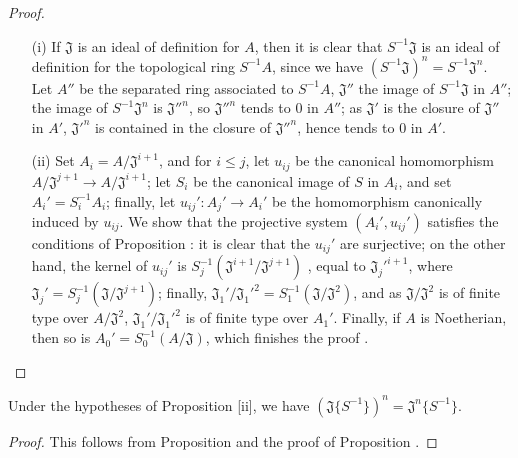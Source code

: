 \begin{proof}
\medskip\noindent
\begin{enumerate}
  \item[(i)] If $\mathfrak{J}$ is an ideal of definition for $A$, then it is clear that
    $S^{-1}\mathfrak{J}$ is an ideal of definition for the topological ring $S^{-1}A$, since we
    have $(S^{-1}\mathfrak{J})^n=S^{-1}\mathfrak{J}^n$. Let $A''$ be the separated ring associated
    to $S^{-1}A$, $\mathfrak{J}''$ the image of $S^{-1}\mathfrak{J}$ in $A''$; the image of
    $S^{-1}\mathfrak{J}^n$ is ${\mathfrak{J}''}^n$, so ${\mathfrak{J}''}^n$ tends to $0$ in $A''$;
    as $\mathfrak{J}'$ is the closure of $\mathfrak{J}''$ in $A'$, ${\mathfrak{J}'}^n$ is contained
    in the closure of ${\mathfrak{J}''}^n$, hence tends to $0$ in $A'$.
  \item[(ii)] Set $A_i=A/\mathfrak{J}^{i+1}$, and for $i\leq j$, let $u_{ij}$ be the canonical
    homomorphism $A/\mathfrak{J}^{j+1}\to A/\mathfrak{J}^{i+1}$; let $S_i$ be the canonical image of
    $S$ in $A_i$, and set $A_i'=S_i^{-1}A_i$; finally, let $u_{ij}':A_j'\to A_i'$ be the homomorphism
    canonically induced by $u_{ij}$. We show that the projective system $(A_i',u_{ij}')$ satisfies
    the conditions of Proposition : it is clear that the $u_{ij}'$
    are surjective; on the other hand, the kernel of $u_{ij}'$ is
    $S_j^{-1}(\mathfrak{J}^{i+1}/\mathfrak{J}^{j+1})$ , equal to
    ${\mathfrak{J}_j'}^{i+1}$, where $\mathfrak{J}_j'=S_j^{-1}(\mathfrak{J}/\mathfrak{J}^{j+1})$;
    finally, $\mathfrak{J}_1'/{\mathfrak{J}_1'}^2=S_1^{-1}(\mathfrak{J}/\mathfrak{J}^2)$, and as
    $\mathfrak{J}/\mathfrak{J}^2$ is of finite type over $A/\mathfrak{J}^2$,
    $\mathfrak{J}_1'/{\mathfrak{J}_1'}^2$ is of finite type over $A_1'$. Finally, if $A$ is
    Noetherian, then so is $A_0'=S_0^{-1}(A/\mathfrak{J})$, which finishes the proof .
\end{enumerate}
\end{proof}

\begin{corollary}[7.6.12]
\label{0.7.6.12}
Under the hypotheses of Proposition [ii], we have
$(\mathfrak{J}\{S^{-1}\})^n=\mathfrak{J}^n\{S^{-1}\}$.
\end{corollary}

\begin{proof}
This follows from Proposition  and the proof of
Proposition .
\end{proof}

